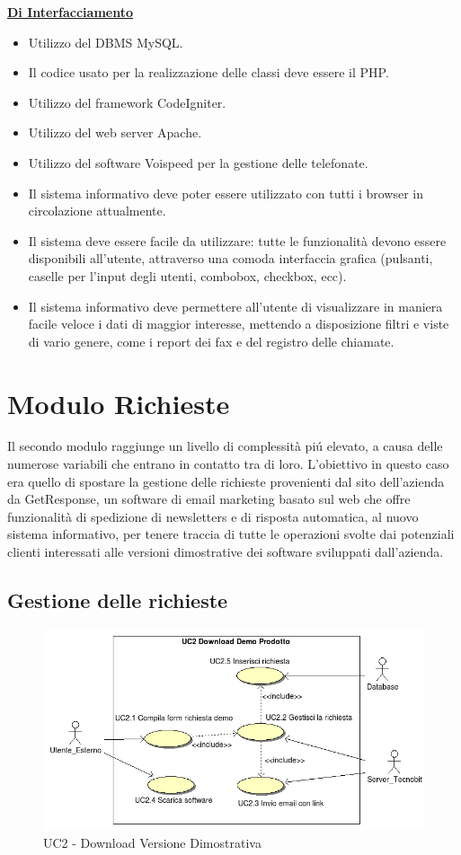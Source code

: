 \underline{\textbf{Di Interfacciamento}}
\begin{itemize}
	  \item Utilizzo del DBMS MySQL.
	  \item Il codice usato per la realizzazione delle classi deve essere il PHP.			
	  \item Utilizzo del framework CodeIgniter.
	  \item Utilizzo del web server Apache.
	  \item Utilizzo del software Voispeed per la gestione delle telefonate.
	  \item Il sistema informativo deve poter essere utilizzato con tutti i browser in circolazione attualmente.
	  \item Il sistema deve essere facile da utilizzare: tutte le funzionalit\`a devono essere disponibili all’utente, attraverso una comoda interfaccia grafica (pulsanti, caselle per l’input degli utenti, combobox, checkbox, ecc).
	  \item Il sistema informativo deve permettere all’utente di visualizzare in maniera facile veloce i dati di maggior interesse, mettendo a disposizione filtri e viste di vario genere, come i report dei fax e del registro delle chiamate.
\end{itemize}

\newpage
\section{Modulo Richieste}
Il secondo modulo raggiunge un livello di complessit\`a pi\'u elevato, a causa delle numerose variabili che entrano in contatto tra di loro. L'obiettivo in questo caso era quello di spostare la gestione delle richieste provenienti dal sito dell'azienda da GetResponse, un software di email marketing basato sul web che offre funzionalit\`a di spedizione di newsletters e di risposta automatica, al nuovo sistema informativo, per tenere traccia di tutte le operazioni svolte dai potenziali clienti interessati alle versioni dimostrative dei software sviluppati dall'azienda. 

\subsection{Gestione delle richieste}
\begin{figure}[!ht]
\centering
 \includegraphics[scale=0.7]{./images/UC2_download.png}
\caption{UC2 - Download Versione Dimostrativa}
\end{figure}

